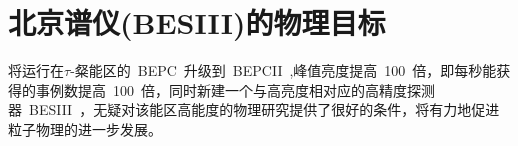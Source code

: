 \begin{comment}
升级后的~BEPCII~是一个多束团的双环对撞机。双环指的是正负电子束流分别注入在两个彼此独立的储存环中，经加速后在对撞点发生对撞。多束团对撞可以大幅度的提高亮度。~BEPCII~的峰值亮度设计为在~1.89Gev~处达~1$\times$$10^{33}$$cm^{-2}$$s^{-1}$~。高亮度意味着可以获得大量的物理事例，为诸多基于巨大统计量的物理过程的研究和分析提供良好的实验基础。表~\ref{tbl:event-Number}~列出了~BEPCII~运行一年可以累积的各种物理事例数。
\begin{table}[h]
    \centering
    \caption{\label{tbl:event-Number} BEPCII运行一年可以积累的事例数}
    \footnotesize
    \begin{tabular}{llllc}
        \hline
        物理& 质心系能量& 峰值亮度& 物理截面& 每年产生事例数 \\
             &(Gev)      &($10^{33} $$cm^{-2}$$s^{-1}$)& (nb)\\
        \hline
        $J/\psi$& 3.097& 0.6& ～3400&  10$\times$$10^{9}$ \\
        $\tau$&   3.670& 1.0& ～2.4&    12$\times$$10^{6}$ \\
        $\psi'$&  3.686& 1.0& ～640&    3$\times$$10^{9}$\\
        D&        3.770& 1.0& ～6.5&    32$\times$$10^{6}$\\
        $D_{s}$&   4.040& 0.6& ～0.32&   1$\times$$10^{6}$\\
        $D_{s}$&   4.160& 0.6& ～1.0&    3$\times$$10^{6}$\\
        \hline
    \end{tabular}
\end{table}

\section{~BESIII~物理目标}
~BEPCII~运行在~$\tau$~-粲能区($\approx$~3~Gev),~BESIII~是运行在~BEPCII~上的大型通用探测器，通过收集~$\tau$~-粲能区的正负电子对撞产生的末态粒子进行~$\tau$~-粲物理研究。~BESIII~主要研究的物理目标有：轻强子谱、粲物理、~QCD~与~$\tau$~物理~\cite{wangyf2011}~\cite{chaokt:2009}。
\end{comment}

\section{北京谱仪(BESIII)的物理目标}
将运行在$\tau$-粲能区的~BEPC~升级到~BEPCII~,峰值亮度提高~100~倍，即每秒能获得的事例数提高~100~倍，同时新建一个与高亮度相对应的高精度探测器~BESIII~，无疑对该能区高能度的物理研究提供了很好的条件，将有力地促进粒子物理的进一步发展。

